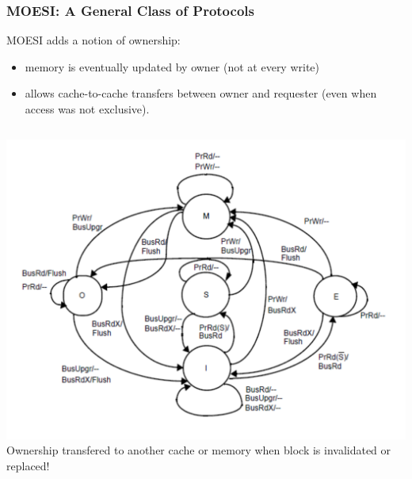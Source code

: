 \documentclass{beamer}
\newcommand{\emp}[1]{\textcolor{DikuRed}{ #1}}
\begin{document}
\begin{frame}[fragile,t]
\frametitle{MOESI: A General Class of Protocols}

MOESI adds a notion of ownership:
\begin{itemize}
    \item memory is eventually updated by owner (not at every write)
    \item allows cache-to-cache transfers between owner and requester
            (even when access was not exclusive).
\end  {itemize}


\begin{columns}\hspace{-5ex}
\includegraphics[width=45ex]{FigsInfCoherence/MOESI}
\emp{Ownership transfered to another cache or memory when
block is invalidated or replaced!}
\end{columns}

\end{frame}
\end{document}
